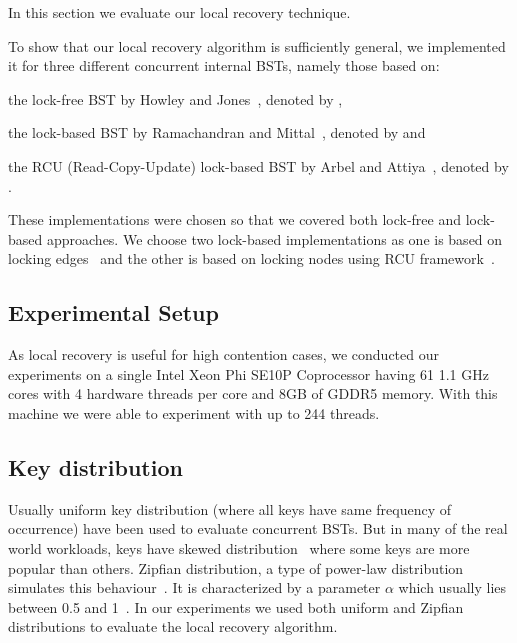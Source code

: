\newcommand{\retries}{\emph {retries}}
\newcommand{\seekTime}{\emph {seek-time}}
\newcommand{\modifyTime}{\emph {modify-time}}
\newcommand{\seekLength}{\emph {seek-length}}
\newcommand{\estLatencyImpact}{\emph {latency-impact}}
\newcommand{\throughput}{\emph {throughput}}
\newcommand{\action}{modify}

In this section we evaluate our local recovery technique. 

To show that our local recovery algorithm is sufficiently general, we implemented it for three different concurrent internal BSTs, namely those based on:
\begin{enumerate*}[label=(\roman*)]
\item the lock-free BST by Howley and Jones~\cite{HowJon:2012:SPAA}, denoted by \HJBST{},
\item the lock-based BST by Ramachandran and Mittal~\cite{RamMit:2015:PPoPP}, denoted by \CASTLE{} and
\item the RCU (Read-Copy-Update) lock-based BST by Arbel and Attiya~\cite{ArbAtt:2014:PODC}, denoted by \CITRUS{}.
\end{enumerate*}
These implementations were chosen so that we covered both lock-free and lock-based approaches. We choose two lock-based implementations as one is based on locking edges~\cite{RamMit:2015:PPoPP} and the other is based on locking nodes using RCU framework~\cite{ArbAtt:2014:PODC}.

\subsection*{Experimental Setup}
As local recovery is useful for high contention cases, we conducted our experiments on a single Intel Xeon Phi SE10P Coprocessor having 61 1.1 GHz cores with 4 hardware threads per core and 8GB of GDDR5 memory. With this machine we were able to experiment with up to 244 threads.

\subsection*{Key distribution}
Usually uniform key distribution (where all keys have same frequency of occurrence) have been used to evaluate concurrent BSTs. But in many of the real world workloads, keys have skewed distribution~\cite{ClaSha+:2009:SIAM} where some keys are more popular than others. Zipfian distribution, a type of power-law distribution simulates this behaviour~\cite{BreCao+:1999:INFOCOM,FalJag:1992:VLDB,GraSun+:1994:SIGMOD}. It is characterized by a parameter $\alpha$ which usually lies between 0.5 and 1~\cite{BreCao+:1999:INFOCOM,AdaHub:2002:GLOTTMET}. In our experiments we used both uniform and Zipfian distributions to evaluate the local recovery algorithm.

